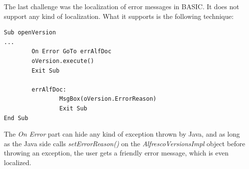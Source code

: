 The last challenge was the localization of error messages in BASIC. It does not
support any kind of localization. What it supports is the following technique:

\begin{lstlisting}
Sub openVersion
...
        On Error GoTo errAlfDoc
        oVersion.execute()
        Exit Sub

        errAlfDoc:
                MsgBox(oVersion.ErrorReason)
                Exit Sub
End Sub
\end{lstlisting}

The \emph{On Error} part can hide any kind of exception thrown by Java, and as
long as the Java side calls \emph{setErrorReason()} on the
\emph{AlfrescoVersionsImpl} object before throwing an exception, the user gets
a friendly error message, which is even localized.
